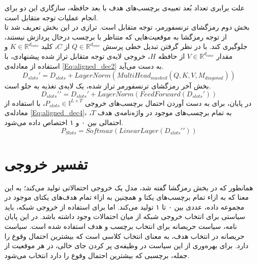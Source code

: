 علت برابری تعداد بُعد تعبیه‌ی برچسب‌های هدف با بعد حافظه، سازگاری این دو برای انجام عملیات توجه متقابل است.\\
بخش دوم رمزگشای ترنسفورمر، توجه متقابل است. ترازی در این بخش تعریف شد تا از توجه رمزگشا به موقعیت‌هایی که متناظر با برچسب درحال پردازش نیستند، جلوگیری کند. با در نظر گرفتن تبدیل خطی پرسش $Q\in\mathbb{R}^{d_{conv}}$ از $C$، کلید $K\in\mathbb{R}^{d_{conv}}$ و مقدار $V\in\mathbb{R}^{d_{conv}}$ از حافظه $H$، خروجی لایه‌ی توجه متقابل تراز شده پیشنهادی، با استفاده از معادله‌ی \ref{Eq:aligned_dec2} به دست می‌آید.
  \begin{equation}
 	D_{slots} \prime = D_{slots} + LayerNorm(MultiHead_{masked}(Q,K,V,M_{diagonal}))
 	\label{Eq:aligned_dec2}
 \end{equation}
 بخش آخر رمزگشای ترنسفورمر تراز شده، یک لایه‌ی تغذیه به جلو است.
 \begin{equation}
 	D_{slots} \prime\prime = D_{slots}\prime + LayerNorm(FeedForward(D_{slots}\prime))
 	\label{Eq:aligned_dec3}
 \end{equation}
در پایان، برای به دست آوردن احتمال برچسب‌های خروجی $P_{slots}\in\mathbb{I}^{L\times T}$، با استفاده از معادله‌ی \ref{Eq:aligned_dec4}، به تمام برچسب‌های موجود در واژه‌نامه‌ی هدف $T$، احتمالی بین ۰ و ۱ اختصاص داده می‌شود.
\begin{equation}
	P_{Slots} = Softmax(LinearLayer(D_{slots}\prime\prime))
	\label{Eq:aligned_dec4}
\end{equation}


\section{تفسیر خروجی} %
همانطور که در بخش رمزگشا گفته شد، مدل یک خروجی احتمالاتی تولید می‌کند؛ به این معنا که به ازاء تمام برچسب‌های یکتا و همچنین به ازاء تمام هدف‌های یکتای موجود در مجموعه داده، عددی بین ۰ تا ۱ تولید می‌کند. اما برای استفاده از خروجی شبکه، باید سیاستی برای انتخاب خروجی شبکه از میان احتمالات وجود داشته باشد. در این پایان نامه، سیاست حریصانه  برای انتخاب برچسب و هدف استفاده شده است. سیاست حریصانه در انتخاب هدف، به معنای انتخاب کلاسی است که بیشترین احتمال وقوع را دارد. برای بهره‌وری از این سیاست در وظیفه‌ی پر کردن جای خالی، در هر موقعیت از جمله، برچسبی که بیشترین احتمال وقوع را دارد انتخاب می‌شود.